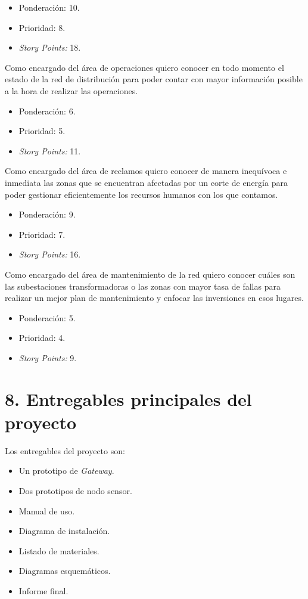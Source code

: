 \documentclass[
11pt, %
]{charter}
\begin{document}
\begin{itemize}
	\item Ponderación: 10.
	\item Prioridad: 8.
	\item \textit{Story Points:} 18.
\end{itemize}

Como encargado del área de operaciones quiero conocer en todo momento el estado de la red de distribución para poder contar con mayor información posible a la hora de realizar las operaciones.

\begin{itemize}
	\item Ponderación: 6.
	\item Prioridad: 5.
	\item \textit{Story Points:} 11.
\end{itemize}

Como encargado del área de reclamos quiero conocer de manera inequívoca e inmediata las zonas que se encuentran afectadas por un corte de energía para poder gestionar eficientemente los recursos humanos con los que contamos.

\begin{itemize}
	\item Ponderación: 9.
	\item Prioridad: 7.
	\item \textit{Story Points:} 16.
\end{itemize}

Como encargado del área de mantenimiento de la red quiero conocer cuáles son las subestaciones transformadoras o las zonas con mayor tasa de fallas para realizar un mejor plan de mantenimiento y enfocar las inversiones en esos lugares.

\begin{itemize}
	\item Ponderación: 5.
	\item Prioridad: 4.
	\item \textit{Story Points:} 9.
\end{itemize}

\section{8. Entregables principales del proyecto}
\label{sec:entregables}

Los entregables del proyecto son:

\begin{itemize}
	\item Un prototipo de \textit{Gateway}.
	\item Dos prototipos de nodo sensor.
	\item Manual de uso.
	\item Diagrama de instalación.
	\item Listado de materiales.
	\item Diagramas esquemáticos.
	\item Informe final.
\end{itemize}
\end{document}
